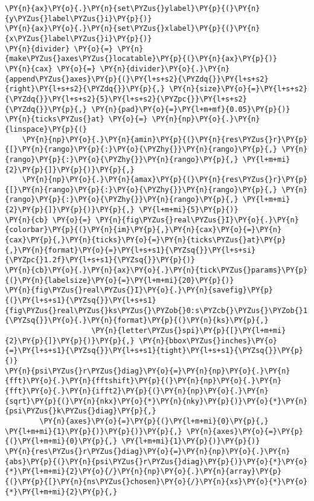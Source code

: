 \begin{Verbatim}[commandchars=\\\{\}]
\PY{n}{ax}\PY{o}{.}\PY{n}{set\PYZus{}ylabel}\PY{p}{(}\PY{n}{y\PYZus{}label\PYZus{}i}\PY{p}{)}
\PY{n}{ax}\PY{o}{.}\PY{n}{set\PYZus{}xlabel}\PY{p}{(}\PY{n}{x\PYZus{}label\PYZus{}i}\PY{p}{)}
\PY{n}{divider} \PY{o}{=} \PY{n}{make\PYZus{}axes\PYZus{}locatable}\PY{p}{(}\PY{n}{ax}\PY{p}{)}
\PY{n}{cax} \PY{o}{=} \PY{n}{divider}\PY{o}{.}\PY{n}{append\PYZus{}axes}\PY{p}{(}\PY{l+s+s2}{\PYZdq{}}\PY{l+s+s2}{right}\PY{l+s+s2}{\PYZdq{}}\PY{p}{,} \PY{n}{size}\PY{o}{=}\PY{l+s+s2}{\PYZdq{}}\PY{l+s+s2}{5}\PY{l+s+s2}{\PYZpc{}}\PY{l+s+s2}{\PYZdq{}}\PY{p}{,} \PY{n}{pad}\PY{o}{=}\PY{l+m+mf}{0.05}\PY{p}{)}
\PY{n}{ticks\PYZus{}at} \PY{o}{=} \PY{n}{np}\PY{o}{.}\PY{n}{linspace}\PY{p}{(}
    \PY{n}{np}\PY{o}{.}\PY{n}{amin}\PY{p}{(}\PY{n}{res\PYZus{}r}\PY{p}{[}\PY{n}{rango}\PY{p}{:}\PY{o}{\PYZhy{}}\PY{n}{rango}\PY{p}{,} \PY{n}{rango}\PY{p}{:}\PY{o}{\PYZhy{}}\PY{n}{rango}\PY{p}{,} \PY{l+m+mi}{2}\PY{p}{]}\PY{p}{)}\PY{p}{,}
    \PY{n}{np}\PY{o}{.}\PY{n}{amax}\PY{p}{(}\PY{n}{res\PYZus{}r}\PY{p}{[}\PY{n}{rango}\PY{p}{:}\PY{o}{\PYZhy{}}\PY{n}{rango}\PY{p}{,} \PY{n}{rango}\PY{p}{:}\PY{o}{\PYZhy{}}\PY{n}{rango}\PY{p}{,} \PY{l+m+mi}{2}\PY{p}{]}\PY{p}{)}\PY{p}{,} \PY{l+m+mi}{5}\PY{p}{)}
\PY{n}{cb} \PY{o}{=} \PY{n}{fig\PYZus{}real\PYZus{}I}\PY{o}{.}\PY{n}{colorbar}\PY{p}{(}\PY{n}{im}\PY{p}{,}\PY{n}{cax}\PY{o}{=}\PY{n}{cax}\PY{p}{,}\PY{n}{ticks}\PY{o}{=}\PY{n}{ticks\PYZus{}at}\PY{p}{,}\PY{n}{format}\PY{o}{=}\PY{l+s+s1}{\PYZsq{}}\PY{l+s+si}{\PYZpc{}1.2f}\PY{l+s+s1}{\PYZsq{}}\PY{p}{)}
\PY{n}{cb}\PY{o}{.}\PY{n}{ax}\PY{o}{.}\PY{n}{tick\PYZus{}params}\PY{p}{(}\PY{n}{labelsize}\PY{o}{=}\PY{l+m+mi}{20}\PY{p}{)}
\PY{n}{fig\PYZus{}real\PYZus{}I}\PY{o}{.}\PY{n}{savefig}\PY{p}{(}\PY{l+s+s1}{\PYZsq{}}\PY{l+s+s1}{fig\PYZus{}real\PYZus{}ks\PYZus{}\PYZob{}0:s\PYZcb{}\PYZus{}\PYZob{}1:s\PYZcb{}}\PY{l+s+s1}{\PYZsq{}}\PY{o}{.}\PY{n}{format}\PY{p}{(}\PY{n}{ks}\PY{p}{,}
                    \PY{n}{letter\PYZus{}spi}\PY{p}{[}\PY{l+m+mi}{2}\PY{p}{]}\PY{p}{)}\PY{p}{,} \PY{n}{bbox\PYZus{}inches}\PY{o}{=}\PY{l+s+s1}{\PYZsq{}}\PY{l+s+s1}{tight}\PY{l+s+s1}{\PYZsq{}}\PY{p}{)}
\PY{n}{psi\PYZus{}r\PYZus{}diag}\PY{o}{=}\PY{n}{np}\PY{o}{.}\PY{n}{fft}\PY{o}{.}\PY{n}{fftshift}\PY{p}{(}\PY{n}{np}\PY{o}{.}\PY{n}{fft}\PY{o}{.}\PY{n}{ifft2}\PY{p}{(}\PY{n}{np}\PY{o}{.}\PY{n}{sqrt}\PY{p}{(}\PY{n}{nkx}\PY{o}{*}\PY{n}{nky}\PY{p}{)}\PY{o}{*}\PY{n}{psi\PYZus{}k\PYZus{}diag}\PY{p}{,}
        \PY{n}{axes}\PY{o}{=}\PY{p}{(}\PY{l+m+mi}{0}\PY{p}{,} \PY{l+m+mi}{1}\PY{p}{)}\PY{p}{)}\PY{p}{,} \PY{n}{axes}\PY{o}{=}\PY{p}{(}\PY{l+m+mi}{0}\PY{p}{,} \PY{l+m+mi}{1}\PY{p}{)}\PY{p}{)}
\PY{n}{res\PYZus{}r\PYZus{}diag}\PY{o}{=}\PY{n}{np}\PY{o}{.}\PY{n}{abs}\PY{p}{(}\PY{n}{psi\PYZus{}r\PYZus{}diag}\PY{p}{)}\PY{o}{*}\PY{o}{*}\PY{l+m+mi}{2}\PY{o}{/}\PY{n}{np}\PY{o}{.}\PY{n}{array}\PY{p}{(}\PY{p}{[}\PY{n}{ns\PYZus{}chosen}\PY{o}{/}\PY{n}{xs}\PY{o}{*}\PY{o}{*}\PY{l+m+mi}{2}\PY{p}{,}

\end{Verbatim}
